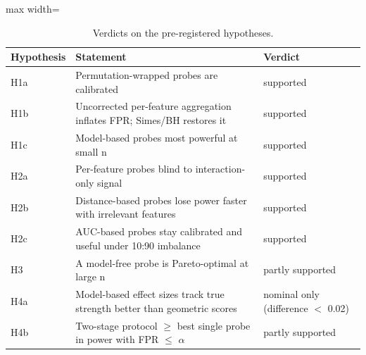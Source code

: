 \begin{table}[!t]
\centering
\caption{Verdicts on the pre-registered hypotheses.}
\label{tab:verdicts}
\footnotesize
\begin{adjustbox}{max width=\linewidth}
\begin{tabular}{lp{5.3cm}l}
\hline
Hypothesis & Statement & Verdict \\ \hline
H1a & Permutation-wrapped probes are calibrated & supported \\
H1b & Uncorrected per-feature aggregation inflates FPR; Simes/BH restores it & supported \\
H1c & Model-based probes most powerful at small n & supported \\
H2a & Per-feature probes blind to interaction-only signal & supported \\
H2b & Distance-based probes lose power faster with irrelevant features & supported \\
H2c & AUC-based probes stay calibrated and useful under 10:90 imbalance & supported \\
H3 & A model-free probe is Pareto-optimal at large n & partly supported \\
H4a & Model-based effect sizes track true strength better than geometric scores & nominal only (difference $<$ 0.02) \\
H4b & Two-stage protocol $\ge$ best single probe in power with FPR $\le$ $\alpha$ & partly supported \\
\hline
\end{tabular}
\end{adjustbox}
\end{table}
